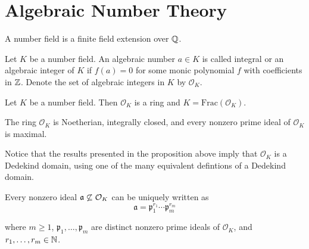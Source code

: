 \setchapterpreamble[u]{\margintoc}
\chapter{Algebraic Number Theory}

\begin{definition}
    A number field is a finite field extension over $\mathbb{Q}$.
\end{definition}

\begin{definition}
    Let $K$ be a number field. An algebraic number $a \in K$ is called integral or an algebraic integer of $K$ if $f(a) = 0$ for some monic polynomial $f$ with coefficients in $\mathbb{Z}$. Denote the set of algebraic integers in $K$ by $\mathcal{O}_{K}$.
\end{definition}


\begin{proposition}
    Let $K$ be a number field. Then $\mathcal{O}_{K}$ is a ring and $K = \textrm{Frac}(\mathcal{O}_{K})$.
\end{proposition}

\begin{proposition}
    The ring $\mathcal{O}_{K}$ is Noetherian, integrally closed, and every nonzero prime ideal of $\mathcal{O}_{K}$ is maximal.
\end{proposition}

Notice that the results presented in the proposition above imply that $\mathcal{O}_{K}$ is a Dedekind domain, using one of the many equivalent defintions of a Dedekind domain.

\begin{theorem}
    Every nonzero ideal $\mathfrak{a} \not\subseteq \mathcal{O}_{K}$ can be uniquely written as
        \[\mathfrak{a} = \mathfrak{p}_1^{r_1}\cdots \mathfrak{p}_m^{r_m}\]

    where $m \geq 1$, $\mathfrak{p}_1,\ldots, \mathfrak{p}_m$ are distinct nonzero prime ideals of $\mathcal{O}_{K}$, and $r_1, \ldots, r_m \in \mathbb{N}$.
\end{theorem}

